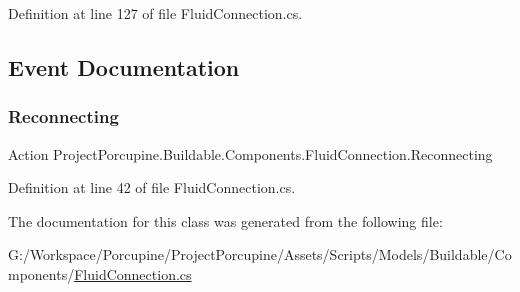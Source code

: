 Definition at line 127 of file Fluid\+Connection.\+cs.



\subsection{Event Documentation}
\mbox{\label{class_project_porcupine_1_1_buildable_1_1_components_1_1_fluid_connection_aab0b377cdb5f14999d2b84729b8b1f2a}} 
\subsubsection{\texorpdfstring{Reconnecting}{Reconnecting}}
{\footnotesize\ttfamily Action Project\+Porcupine.\+Buildable.\+Components.\+Fluid\+Connection.\+Reconnecting}



Definition at line 42 of file Fluid\+Connection.\+cs.



The documentation for this class was generated from the following file\+:\begin{DoxyCompactItemize}
\item 
G\+:/\+Workspace/\+Porcupine/\+Project\+Porcupine/\+Assets/\+Scripts/\+Models/\+Buildable/\+Components/\hyperlink{_fluid_connection_8cs}{Fluid\+Connection.\+cs}\end{DoxyCompactItemize}
